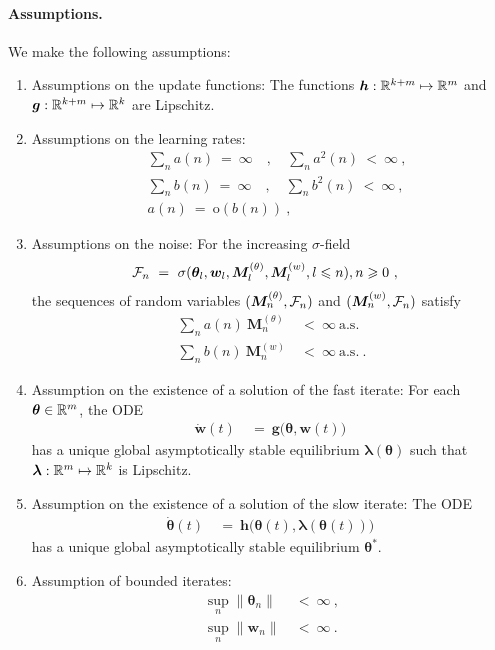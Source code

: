 \documentclass{article}
\newcommand\Bg{\bm{g}}
\newcommand\Bh{\bm{h}}
\newcommand\Bw{\bm{w}}
\newcommand\BM{\bm{M}}
\newcommand\Bla{\bm{\lambda}}
\newcommand\Bth{\bm{\theta}}
\newcommand{\Ro}{\mathrm{o}} \newcommand{\Rp}{\mathrm{p}}
\renewcommand{\leq}{\leqslant}
\renewcommand{\geq}{\geqslant}
\begin{document}
\paragraph{Assumptions.}
We make the following assumptions:
\begin{enumerate}[label=\textbf{(A\arabic*)}]
\item Assumptions on the update functions:
The functions $\Bh: \dR^{k+m} \mapsto \dR^{m}$ and  $\Bg: \dR^{k+m}
\mapsto \dR^{k}$ are Lipschitz.
\item
Assumptions on the learning rates:
\begin{align}
&\sum_{n} a(n) \ = \ \infty \quad , \quad
\sum_{n} a^2(n) \ < \ \infty \ , \\
&\sum_{n} b(n) \ = \ \infty \quad , \quad
\sum_{n} b^2(n) \ < \ \infty \ , \\
&a(n) \ = \ \Ro(b(n))\ ,
\end{align}


\item Assumptions on the noise:
For the increasing $\sigma$-field
\begin{align} \nonumber
\cF_n \ &= \
\sigma(\Bth_l, \Bw_l, \BM^{(\theta)}_{l}, \BM^{(w)}_{l},
l \leq n), n \geq 0 \ ,
\end{align}
the sequences of random variables
$(\BM^{(\theta)}_{n},\cF_n)$ and
$(\BM^{(w)}_{n},\cF_n)$ satisfy
\begin{align}
\sum_n a(n) \ \BM^{(\theta)}_{n} \ &< \ \infty \ \text{a.s.} \\
\sum_n b(n) \ \BM^{(w)}_{n} \ &< \ \infty \ \text{a.s.} \ .
\end{align}


\item Assumption on the existence of a solution of the fast iterate:
For each $\Bth \in \dR^m$, the ODE
\begin{align}
\dot{\Bw}(t) \ &= \ \Bg\big(\Bth, \Bw(t)\big) \
\end{align}
has a unique global asymptotically stable equilibrium
$\Bla(\Bth)$ such that $\Bla: \dR^m \mapsto \dR^k$ is Lipschitz.

\item Assumption on the existence of a solution of the slow iterate:
The ODE
\begin{align}
\dot{\Bth}(t) \ &= \ \Bh\big(\Bth(t), \Bla(\Bth(t))\big) \
\end{align}
has a unique global asymptotically stable
equilibrium $\Bth^{*}$.

\item Assumption of bounded iterates:
\begin{align}
\sup_n \| \Bth_n \| \ &< \ \infty \ , \\
\sup_n \| \Bw_n \| \ &< \ \infty \ .
\end{align}
\end{enumerate}
\end{document}
